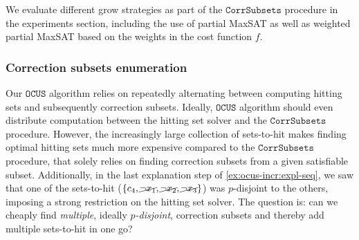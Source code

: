 \documentclass[a4paper,UKenglish,cleveref, autoref, thm-restate, pdfa]{lipics-v2021}
\renewcommand\comment[1]{}
\newcommand{\tias}[1]{{\comment{\color{blue}Tias:#1}}}
\newcommand{\emilio}[1]{{\comment{\color{red}Emilio: #1}}}
\newcommand{\bart}[1]{{\comment{\color{OliveGreen}Bart: #1}}}
\newcommand\mm[1]{\ensuremath{#1}\xspace}
\newcommand\call[1]{\mm{\texttt{#1}}}
\newcommand\comus{\mm{\call{OCUS}}}
\newcommand\corrsubsets{\mm{\call{CorrSubsets}}}
\newcommand\maxsat{MaxSAT\xspace}
\begin{document}
	We evaluate different grow strategies as part of the \corrsubsets procedure in the experiments section, including the use of partial \maxsat as well as weighted partial \maxsat based on the weights in the cost function $f$.
	\bart{This section still makes sense to me. However, it only describes a single type of grow based on maxsat. In the experiments we will have multiple. In that case I would expect them to also be described here. Or... we drop all the ones we do not discuss here from the experiments...}
	\emilio{Added `No grow' and sat model in the intro.}
	
	
	
	\subsubsection{Correction subsets enumeration}\label{sec:correction_subset_enum}
	Our \comus algorithm relies on repeatedly alternating between computing hitting sets and subsequently correction subsets. 
	Ideally, \comus algorithm should even distribute computation between the hitting set solver and the \corrsubsets procedure.
	However, the increasingly large collection of sets-to-hit makes finding optimal hitting sets much more expensive compared to the \corrsubsets procedure, that solely relies on finding correction subsets from a given satisfiable subset.
	Additionally, in the last explanation step of \cref{ex:ocus-incr:expl-seq}, we saw that one of the sets-to-hit ($\{c_4, \cancel{\lnot x_1} ,\cancel{\lnot x_2} , \cancel{\lnot x_3}\}$) was $p$-disjoint to the others, imposing a strong restriction on the hitting set solver. 
	The question is: can we cheaply find \textit{multiple}, ideally \emph{$p$-disjoint}, correction subsets and thereby add multiple sets-to-hit in one go?
	
\end{document}
